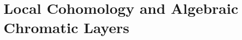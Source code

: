 \section{Local Cohomology and Algebraic Chromatic Layers}\label{sec:chromatic-geometry-localcohomology}
